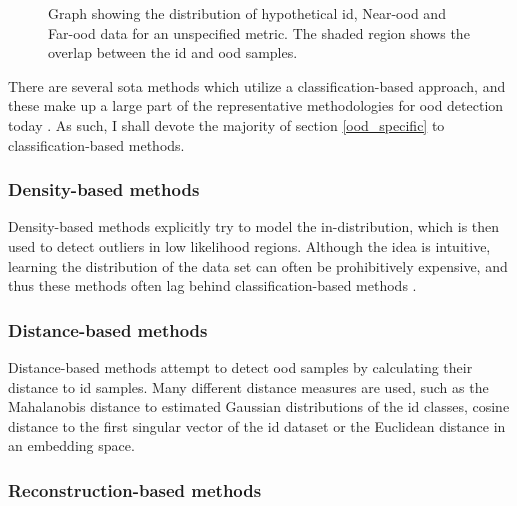 \documentclass[UKenglish]{uiomasterthesis} %
\theoremstyle{definition}
\begin{document}
\begin{figure}[h]
    \begin{center}
        
    \end{center}
    \caption[Hypothetical \ac{id}/\ac{ood} distributions for an \ac{ood} detection metric]{Graph showing the distribution of hypothetical \ac{id}, Near-\ac{ood} and Far-\ac{ood} data for an unspecified metric. The shaded region shows the overlap between the \ac{id} and \ac{ood} samples.}
    \label{fig:ood_metric}
\end{figure}

There are several \ac{sota} methods which utilize a classification-based approach, and these make up a large part of the representative methodologies for \ac{ood} detection today \cite[8]{oodoverview}. As such, I shall devote the majority of section \ref{ood_specific} to classification-based methods.



\subsubsection{Density-based methods}

Density-based methods explicitly try to model the in-distribution, which is then used to detect outliers in low likelihood regions. Although the idea is intuitive, learning the distribution of the data set can often be prohibitively expensive, and thus these methods often lag behind classification-based methods \cite{oodoverview}.
\\

\subsubsection{Distance-based methods} \label{section:distancebasedood}

Distance-based methods attempt to detect \ac{ood} samples by calculating their distance to \ac{id} samples. Many different distance measures are used, such as the Mahalanobis distance to estimated Gaussian distributions of the \ac{id} classes, cosine distance to the first singular vector of the \ac{id} dataset or the Euclidean distance in an embedding space.
\\

\subsubsection{Reconstruction-based methods}
\end{document}

